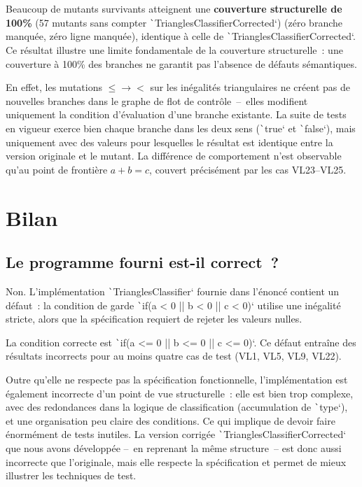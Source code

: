 \documentclass[a4paper,11pt]{article}
\begin{document}
Beaucoup de mutants survivants atteignent une \textbf{couverture structurelle de 100\%} (57 mutants sans compter \texttt`TrianglesClassifierCorrected`) (zéro branche manquée, zéro ligne manquée), identique à celle de \texttt`TrianglesClassifierCorrected`. Ce résultat illustre une limite fondamentale de la couverture structurelle~: une couverture à 100\% des branches ne garantit pas l'absence de défauts sémantiques.

En effet, les mutations $\le \to <$ sur les inégalités triangulaires ne créent pas de nouvelles branches dans le graphe de flot de contrôle~--~elles modifient uniquement la condition d'évaluation d'une branche existante. La suite de tests en vigueur exerce bien chaque branche dans les deux sens (\texttt`true` et \texttt`false`), mais uniquement avec des valeurs pour lesquelles le résultat est identique entre la version originale et le mutant. La différence de comportement n'est observable qu'au point de frontière $a + b = c$, couvert précisément par les cas VL23–VL25.

\section{Bilan}

\subsection{Le programme fourni est-il correct~?}

Non. L'implémentation \texttt`TrianglesClassifier` fournie dans l'énoncé contient un défaut~: la condition de garde \texttt`if(a < 0 || b < 0 || c < 0)` utilise une inégalité stricte, alors que la spécifica\-tion requiert de rejeter les valeurs nulles.

La condition correcte est \texttt`if(a <= 0 || b <= 0 || c <= 0)`. Ce défaut entraîne des résultats incorrects pour au moins quatre cas de test (VL1, VL5, VL9, VL22).

Outre qu'elle ne respecte pas la spécification fonctionnelle, l'implémentation est également incorre\-cte d'un point de vue structurelle~: elle est bien trop complexe, avec des redondances dans la logique de classification (accumulation de \texttt`type`), et une organisation peu claire des conditions. Ce qui implique de devoir faire énormément de tests inutiles. La version corrigée \texttt`TrianglesClassifierCorrected` que nous avons développée --~en reprenant la même structure~-- est donc aussi incorrecte que l'originale, mais elle respecte la spécification et permet de mieux illustrer les techniques de test.
\end{document}
